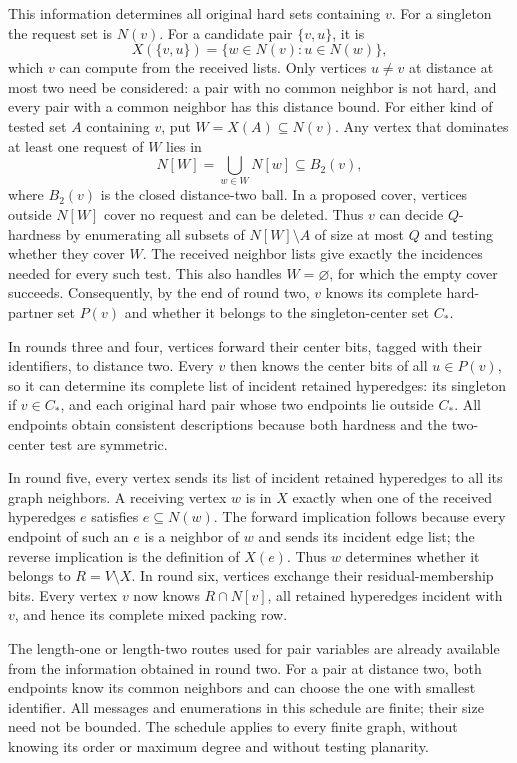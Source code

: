 \documentclass[11pt,a4paper]{article}
\theoremstyle{definition}
\theoremstyle{remark}
\begin{document}
This information determines all original hard sets containing $v$.
For a singleton the request set is $N(v)$.  For a candidate pair
$\{v,u\}$, it is
\[
 X(\{v,u\})=\{w\in N(v):u\in N(w)\},
\]
which $v$ can compute from the received lists.  Only vertices
$u\ne v$ at distance at most two need be considered: a pair with no
common neighbor is not hard, and every pair with a common neighbor
has this distance bound.  For either kind of tested set $A$ containing
$v$, put $W=X(A)\subseteq N(v)$.  Any vertex that dominates at least
one request of $W$ lies in
\[
 N[W]=\bigcup_{w\in W}N[w]\subseteq B_2(v),
\]
where $B_2(v)$ is the closed distance-two ball.  In a proposed cover,
vertices outside $N[W]$ cover no request and can be deleted.  Thus $v$
can decide $Q$-hardness by enumerating all subsets of
$N[W]\setminus A$ of size at most $Q$ and testing whether they cover
$W$.  The received neighbor lists give exactly the incidences needed
for every such test.  This also handles $W=\varnothing$, for which
the empty cover succeeds.  Consequently, by the end of round two,
$v$ knows its complete hard-partner set $P(v)$ and whether it belongs
to the singleton-center set $C_*$.

In rounds three and four, vertices forward their center bits, tagged
with their identifiers, to distance two.  Every $v$ then knows the
center bits of all $u\in P(v)$, so it can determine its complete list
of incident retained hyperedges: its singleton if $v\in C_*$, and
each original hard pair whose two endpoints lie outside $C_*$.  All
endpoints obtain consistent descriptions because both hardness and
the two-center test are symmetric.

In round five, every vertex sends its list of incident retained
hyperedges to all its graph neighbors.  A receiving vertex $w$ is in
$X$ exactly when one of the received hyperedges $e$ satisfies
$e\subseteq N(w)$.  The forward implication follows because every
endpoint of such an $e$ is a neighbor of $w$ and sends its incident
edge list; the reverse implication is the definition of $X(e)$.
Thus $w$ determines whether it belongs to $R=V\setminus X$.
In round six, vertices exchange their residual-membership bits.
Every vertex $v$ now knows $R\cap N[v]$, all retained hyperedges
incident with $v$, and hence its complete mixed packing row.

The length-one or length-two routes used for pair variables are
already available from the information obtained in round two.
For a pair at distance two, both endpoints know its common neighbors
and can choose the one with smallest identifier.  All messages and
enumerations in this schedule are finite; their size need not be
bounded.  The schedule applies to every finite graph, without knowing
its order or maximum degree and without testing planarity.
\end{document}
